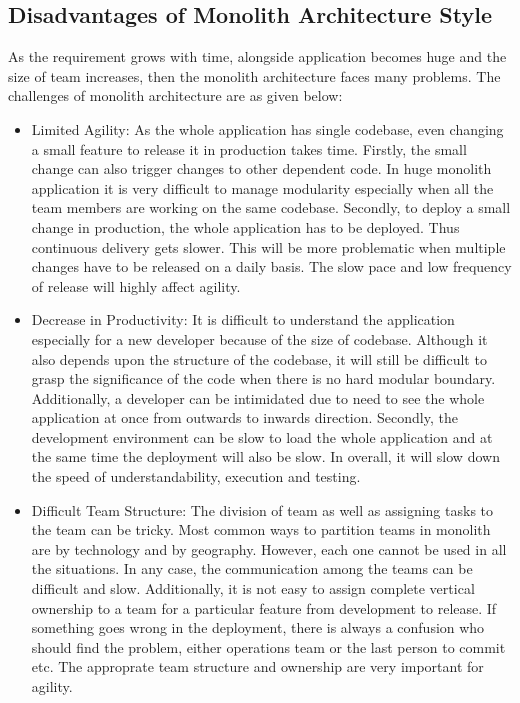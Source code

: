\subsection{Disadvantages of Monolith Architecture Style}\label{subsection:context/monolith-disadvantages}
As the requirement grows with time, alongside application becomes huge and the size of team increases, then the monolith architecture faces many problems. The challenges of monolith architecture are as given below:\cite{Namiot:2014aa}\cite{Newman:2015aa}\cite{Abram:2014aa}\cite{Richardson:2014aa}\cite{Richardson:2014ab}\cite{Gupta:2015aa}
\begin{itemize}[leftmargin=.5in]
\item Limited Agility: As the whole application has single codebase, even changing a small feature to release it in production takes time. Firstly, the small change can also trigger changes to other dependent code. In huge monolith application it is very difficult to manage modularity especially when all the team members are working on the same codebase. Secondly, to deploy a small change in production, the whole application has to be deployed. Thus continuous delivery gets slower. This will be more problematic when multiple changes have to be released on a daily basis. The slow pace and low frequency of release will highly affect agility.
\\
\item Decrease in Productivity: It is difficult to understand the application especially for a new developer because of the size of codebase. Although it also depends upon the structure of the codebase, it will still be difficult to grasp the significance of the code when there is no hard modular boundary. Additionally, a developer can be intimidated due to need to see the whole application at once from outwards to inwards direction. Secondly, the development environment can be slow to load the whole application and at the same time the deployment will also be slow. In overall, it will slow down the speed of understandability, execution and testing.
\\
\item Difficult Team Structure: The division of team as well as assigning tasks to the team can be tricky. Most common ways to partition teams in monolith are by technology and by geography. However, each one cannot be used in all the situations. In any case, the communication among the teams can be difficult and slow. Additionally, it is not easy to assign complete vertical ownership to a team for a particular feature from development to release. If something goes wrong in the deployment, there is always a confusion who should find the problem, either operations team or the last person to commit etc. The approprate team structure and ownership are very important for agility.

\end{itemize}
